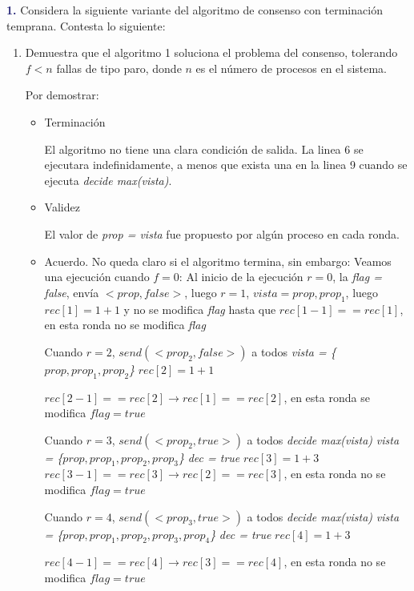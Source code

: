\newpage
\textbf{\textcolor{MidnightBlue}{1.}} Considera la siguiente variante del algoritmo de consenso con terminación temprana.
Contesta lo siguiente:
\begin{enumerate}
    \item Demuestra que el algoritmo 1 soluciona el problema del consenso, tolerando $f < n$ fallas de tipo paro, donde $n$ es el número de procesos en el sistema.
    
    Por demostrar:
    \begin{itemize}
        \item Terminación
        
        El algoritmo no tiene una clara condición de salida. La linea 6 se ejecutara indefinidamente, a menos que exista una en la linea 9 cuando se ejecuta \textit{decide max(vista)}.
        
        \item Validez
        
        El valor de \textit{prop = vista} fue propuesto por algún proceso en cada ronda.

        \item Acuerdo. 
        No queda claro si el algoritmo termina, sin embargo:
        Veamos una ejecución cuando $f=0$:
        Al inicio de la ejecución $r=0$, la \textit{flag = false}, 
        envía $<prop,false>$, luego $r=1$, 
        $vista = prop, prop_1$, luego  
        $rec[1]= 1+1$ y no se modifica \textit{flag} 
        hasta que $rec[1-1]==rec[1]$, 
        en esta ronda no se modifica \textit{flag}

        
        Cuando $r=2$, 
        $send(<prop_2,false>)$ a todos
        \textit{vista = \{$prop,prop_1,prop_2$\}}
        $rec[2]=1+1$

        $rec[2-1]==rec[2] \rightarrow rec[1]==rec[2]$, en esta ronda se modifica $flag=true$

        
        Cuando $r=3$, 
        $send(<prop_2,true>)$ a todos
        \textit{decide max(vista)}
        \textit{vista = \{$prop,prop_1,prop_2,prop_3$\}}
        \textit{ dec = true}
        $rec[3]=1+3$
        $rec[3-1]==rec[3] \rightarrow rec[2]==rec[3]$, en esta ronda no se modifica $flag=true$


        Cuando $r=4$, 
        $send(<prop_3,true>)$ a todos
        \textit{decide max(vista)}
        \textit{vista = \{$prop,prop_1,prop_2,prop_3,prop_4$\}}
        \textit{dec = true}
        $rec[4]=1+3$

        $rec[4-1]==rec[4] \rightarrow rec[3]==rec[4]$, en esta ronda no se modifica $flag=true$


\end{itemize}
\end{enumerate}
